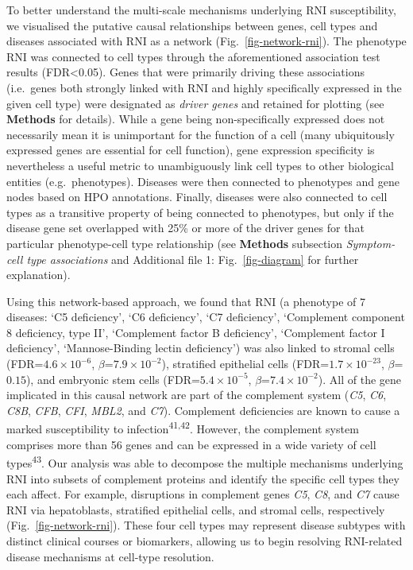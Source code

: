 \documentclass[
]{article}
\begin{document}
To better understand the multi-scale mechanisms underlying RNI
susceptibility, we visualised the putative causal relationships between
genes, cell types and diseases associated with RNI as a network
(Fig.~\ref{fig-network-rni}). The phenotype RNI was connected to cell
types through the aforementioned association test results
(FDR\textless0.05). Genes that were primarily driving these associations
(i.e.~genes both strongly linked with RNI and highly specifically
expressed in the given cell type) were designated as \emph{driver genes}
and retained for plotting (see \textbf{Methods} for details). While a
gene being non-specifically expressed does not necessarily mean it is
unimportant for the function of a cell (many ubiquitously expressed
genes are essential for cell function), gene expression specificity is
nevertheless a useful metric to unambiguously link cell types to other
biological entities (e.g.~phenotypes). Diseases were then connected to
phenotypes and gene nodes based on HPO annotations. Finally, diseases
were also connected to cell types as a transitive property of being
connected to phenotypes, but only if the disease gene set overlapped
with 25\% or more of the driver genes for that particular phenotype-cell
type relationship (see \textbf{Methods} subsection \emph{Symptom-cell
type associations} and Additional file 1: Fig.~\ref{fig-diagram} for
further explanation).

Using this network-based approach, we found that RNI (a phenotype of 7
diseases: `C5 deficiency', `C6 deficiency', `C7 deficiency', `Complement
component 8 deficiency, type II', `Complement factor B deficiency',
`Complement factor I deficiency', `Mannose-Binding lectin deficiency')
was also linked to stromal cells (FDR=\(4.6 \times 10^{-6}\),
\(\beta\)=\(7.9 \times 10^{-2}\)), stratified epithelial cells
(FDR=\(1.7 \times 10^{-23}\), \(\beta\)=\(0.15\)), and embryonic stem
cells (FDR=\(5.4 \times 10^{-5}\), \(\beta\)=\(7.4 \times 10^{-2}\)).
All of the gene implicated in this causal network are part of the
complement system (\emph{C5}, \emph{C6}, \emph{C8B}, \emph{CFB},
\emph{CFI}, \emph{MBL2}, and \emph{C7}). Complement deficiencies are
known to cause a marked susceptibility to
infection\textsuperscript{41,42}. However, the complement system
comprises more than 56 genes and can be expressed in a wide variety of
cell types\textsuperscript{43}. Our analysis was able to decompose the
multiple mechanisms underlying RNI into subsets of complement proteins
and identify the specific cell types they each affect. For example,
disruptions in complement genes \emph{C5}, \emph{C8}, and \emph{C7}
cause RNI via hepatoblasts, stratified epithelial cells, and stromal
cells, respectively (Fig.~\ref{fig-network-rni}). These four cell types
may represent disease subtypes with distinct clinical courses or
biomarkers, allowing us to begin resolving RNI-related disease
mechanisms at cell-type resolution.
\end{document}

